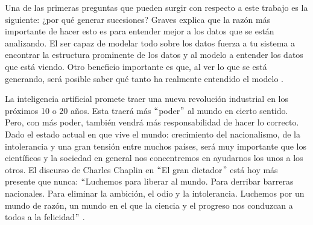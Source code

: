 \vspace{1em}

Una de las primeras preguntas que pueden surgir con respecto a este trabajo es la siguiente: ¿por qué generar sucesiones? Graves explica que la razón más importante de hacer esto es para entender mejor a los datos que se están analizando. El ser capaz de modelar todo sobre los datos fuerza a tu sistema a encontrar la estructura prominente de los datos y al modelo a entender los datos que está viendo. Otro beneficio importante es que, al ver lo que se está generando, será posible saber qué tanto ha realmente entendido el modelo \cite{graves} \cite{DBLP:journals/corr/Graves13}.

\vspace{1em}

La inteligencia artificial promete traer una nueva revolución industrial en los próximos 10 o 20 años. Esta traerá más $``$poder$"$ al mundo en cierto sentido. Pero, con más poder, también vendrá más responsabilidad de hacer lo correcto. Dado el estado actual en que vive el mundo: crecimiento del nacionalismo, de la intolerancia y una gran tensión entre muchos países, será muy importante que los científicos y la sociedad en general nos concentremos en ayudarnos los unos a los otros. El discurso de Charles Chaplin en $``$El gran dictador$"$ está hoy más presente que nunca: $``$Luchemos para liberar al mundo. Para derribar barreras nacionales. Para eliminar la ambición, el odio y la intolerancia. Luchemos por un mundo de razón, un mundo en el que la ciencia y el progreso nos conduzcan a todos a la felicidad$"$ \cite{goodfellow-et-al-2016}.






